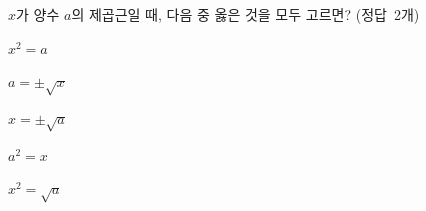 $x$가 양수 $a$의 제곱근일 때, 다음 중 옳은 것을 모두 고르면? \mbox{(정답 2개)}
\begin{choices32}{\rule[-3ex]{0pt}{8ex}$x^2=a$}{\rule[-3ex]{0pt}{8ex}$a=\pm\sqrt{x}$}{\rule[-3ex]{0pt}{8ex}$x=\pm\sqrt{a}$}{\rule[-3ex]{0pt}{8ex}$a^2=x$}{\rule[-3ex]{0pt}{8ex}$x^2=\sqrt{a}$}\end{choices32}
